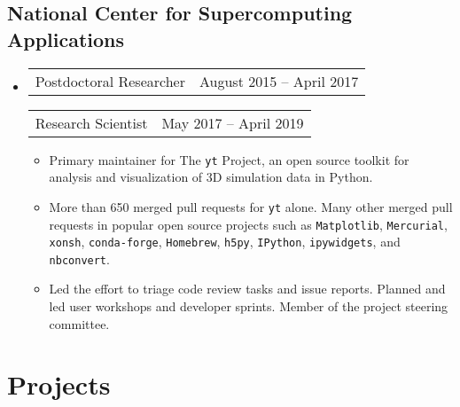 \documentclass[10pt,letterpaper]{article}
\newcommand{\textline}[2]{
  \begin{tabularx}{\textwidth}{XY}
  #1 & #2
  \end{tabularx}
}
\begin{document}
\subsection*{National Center for Supercomputing Applications}
\begin{itemize}
  \item[] \textline{Postdoctoral Researcher}{August 2015 -- April 2017}  \textline{Research
    Scientist}{May 2017 -- April 2019} %
  \begin{itemize}
    \item Primary maintainer for The \texttt{yt} Project, an open source toolkit
      for analysis and visualization of 3D simulation data in Python.
    \item More than 650 merged pull requests for \texttt{yt} alone. Many
      other merged pull requests in popular open source projects such as
      \texttt{Matplotlib}, \texttt{Mercurial}, \texttt{xonsh},
      \texttt{conda-forge}, \texttt{Homebrew}, \texttt{h5py}, \texttt{IPython},
      \texttt{ipywidgets}, and \texttt{nbconvert}.
    \item Led the effort to triage code review tasks and issue reports. Planned
      and led user workshops and developer sprints. Member of the project
      steering committee.
  \end{itemize}

\end{itemize}

\section*{Projects}
\end{document}
